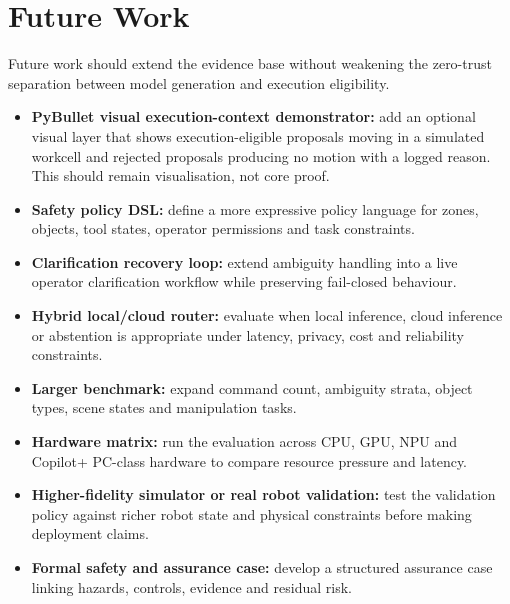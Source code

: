 \section{Future Work}
\label{sec:future_work}

Future work should extend the evidence base without weakening the zero-trust separation between model generation and execution eligibility.

\begin{itemize}
    \item \textbf{PyBullet visual execution-context demonstrator:} add an optional visual layer that shows execution-eligible proposals moving in a simulated workcell and rejected proposals producing no motion with a logged reason. This should remain visualisation, not core proof.
    \item \textbf{Safety policy DSL:} define a more expressive policy language for zones, objects, tool states, operator permissions and task constraints.
    \item \textbf{Clarification recovery loop:} extend ambiguity handling into a live operator clarification workflow while preserving fail-closed behaviour.
    \item \textbf{Hybrid local/cloud router:} evaluate when local inference, cloud inference or abstention is appropriate under latency, privacy, cost and reliability constraints.
    \item \textbf{Larger benchmark:} expand command count, ambiguity strata, object types, scene states and manipulation tasks.
    \item \textbf{Hardware matrix:} run the evaluation across CPU, GPU, NPU and Copilot+ PC-class hardware to compare resource pressure and latency.
    \item \textbf{Higher-fidelity simulator or real robot validation:} test the validation policy against richer robot state and physical constraints before making deployment claims.
    \item \textbf{Formal safety and assurance case:} develop a structured assurance case linking hazards, controls, evidence and residual risk.
\end{itemize}
